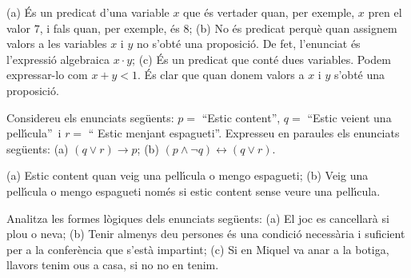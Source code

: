 \begin{solucio}
(a) \'{E}s un predicat d'una variable $x$ que \'{e}s vertader quan, per
exemple, $x$ pren el valor $7$, i fals quan, per exemple, \'{e}s $8$; (b) No
\'{e}s predicat perqu\`{e} quan assignem valors a les variables $x$ i $y$ no
s'obt\'{e} una proposici\'{o}. De fet, l'enunciat \'{e}s l'expressi\'{o}
algebraica $x\cdot y$; (c) \'{E}s un predicat que cont\'{e} dues variables.
Podem expressar-lo com $x+y<1$. \'{E}s clar que quan donem valors a $x$ i $y$
s'obt\'{e} una proposici\'{o}.
\end{solucio}

\begin{exercici}
Considereu els enunciats seg\"{u}ents: $p=$ \textquotedblleft Estic
content\textquotedblright, $q=$ \textquotedblleft Estic veient una
pel\textperiodcentered l\'{\i}cula\textquotedblright\ i $r=$ \textquotedblleft
Estic menjant espagueti\textquotedblright. Expresseu en paraules els enunciats
seg\"{u}ents: (a) $\left(  q\vee r\right)  \longrightarrow p$; (b) $\left(
p\wedge\lnot q\right)  \longleftrightarrow\left(  q\vee r\right)  $.
\end{exercici}

\begin{solucio}
(a) Estic content quan veig una pel\textperiodcentered l\'{\i}cula o mengo
espagueti; (b) Veig una pel\textperiodcentered l\'{\i}cula o mengo espagueti
nom\'{e}s si estic content sense veure una pel\textperiodcentered l\'{\i}cula.
\end{solucio}

\begin{exercici}
Analitza les formes l\`{o}giques dels enunciats seg\"{u}ents: (a) El joc es
cancel\textperiodcentered lar\`{a} si plou o neva; (b) Tenir almenys deu
persones \'{e}s una condici\'{o} necess\`{a}ria i suficient per a la
confer\`{e}ncia que s'est\`{a} impartint; (c) Si en Miquel va anar a la
botiga, llavors tenim ous a casa, si no no en tenim.
\end{exercici}

